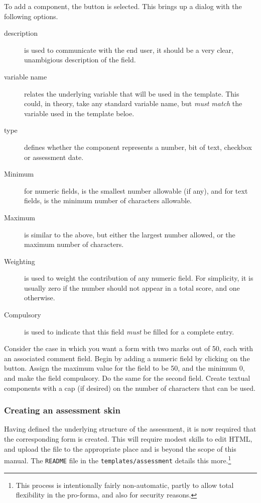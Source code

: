 \documentclass[12 pt]{book}
\begin{document}
To add a component, the  button is selected. This brings
up a dialog with the following options.

\begin{description}
  \item[description] is used to communicate with the end user, it should
  be a very clear, unambigious description of the field.
  \item[variable name] relates the underlying variable that will be used
  in the template. This could, in theory, take any standard variable
  name, but \emph{must match} the variable used in the template beloe.
  \item[type] defines whether the component represents a number, bit of
  text, checkbox or assessment date.
  \item[Minimum] for numeric fields, is the smallest number allowable 
  (if any), and for text fields, is the minimum number of characters
  allowable.
  \item[Maximum] is similar to the above, but either the largest number
  allowed, or the maximum number of characters.
  \item[Weighting] is used to weight the contribution of any numeric
  field. For simplicity, it is usually zero if the number should not
  appear in a total score, and one otherwise.
  \item[Compulsory] is used to indicate that this field \emph{must} be
  filled for a complete entry.
\end{description}

Consider the case in which you want a form with two marks out of 50,
each with
an associated comment field. Begin by adding a numeric field by clicking
on the  button. Assign the maximum value for the field
to be 50, and the minimum 0, and make the field compulsory. Do the same
for the second field. Create textual components with a cap (if desired)
on the number of characters that can be used.

\subsubsection{Creating an assessment skin}

Having defined the underlying structure of the assessment, it is now
required that the corresponding form is created. This will require
modest skills to edit HTML, and upload the file to the appropriate place
and is beyond the scope of this manual. The \lstinline!README! file in the
\lstinline!templates/assessment! details this more.\footnote
{This process is intentionally fairly non-automatic, partly to allow
total flexibility in the pro-forma, and also for security reasons.}
\end{document}
